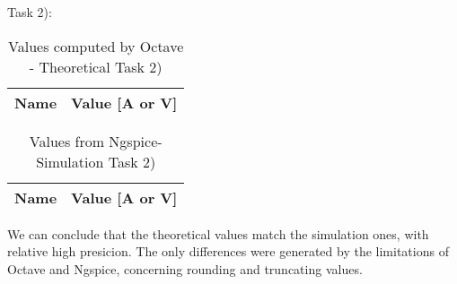 Task 2):

\begin{table}[H]
	\centering
	\begin{tabular}{|l|r|}
    		\hline    
    		{\bf Name} & {\bf Value [A or V]} \\ \hline
    		
  	\end{tabular}
  	\caption{Values computed by Octave - Theoretical Task 2)}
 
\label{tab:node}
\end{table}

\begin{table}[H]
	\centering
	\begin{tabular}{|l|r|}
		\hline    
		{\bf Name} & {\bf Value [A or V]} \\ \hline
    		
	\end{tabular}
	
	\caption{Values from Ngspice- Simulation Task 2)}
    
\label{tab:op1}
\end{table}

We can conclude that the theoretical values match the simulation ones, with relative high presicion. The only
differences were generated by the limitations of Octave and Ngspice, concerning rounding and truncating values.



